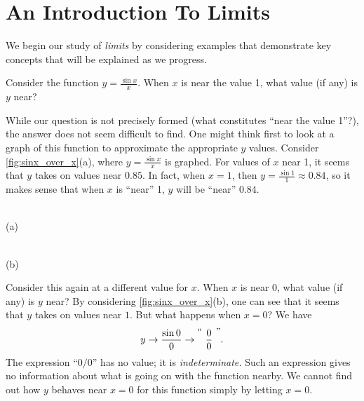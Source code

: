 \section{An Introduction To Limits}\label{sec:limit_intro}

We begin our study of \textit{limits} by considering examples that demonstrate key concepts that will be explained as we progress.

Consider the function $y = \frac{\sin x}{x}$. When $x$ is near the value 1, what value (if any) is $y$ near?

While our question is not precisely formed (what constitutes ``near the value 1''?), the answer does not seem difficult to find. One might think first to look at a graph of this function to approximate the appropriate $y$ values. Consider \autoref{fig:sinx_over_x}(a), where $y = \frac{\sin x}{x}$ is graphed. For values of $x$ near 1, it seems that $y$ takes on values near $0.85$. In fact, when $x=1$, then $y=\frac{\sin 1}{1} \approx 0.84$, so it makes sense that when $x$ is ``near'' 1, $y$ will be ``near'' $0.84$.

%
{
\\ (a)\\
\\ (b)}

Consider this again at a different value for $x$. When $x$ is near 0, what value (if any) is $y$ near? By considering \autoref{fig:sinx_over_x}(b), one can see that it seems that $y$ takes on values near $1$. But what happens when $x=0$? We have $$ y \rightarrow \frac{\sin 0}{0} \rightarrow \raisebox{8pt}{\text{``\ }}\frac{0}{0}\raisebox{8pt}{\text{\ ''}}.$$ 
The expression ``$0/0$'' has no value; it is \emph{indeterminate.}  Such an expression gives no information about what is going on with the function nearby. We cannot find out how $y$ behaves near $x=0$ for this function simply by letting $x=0$. 

